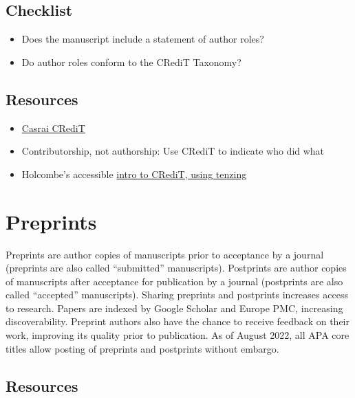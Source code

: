 \documentclass[
  oneside]{book}
\providecommand{\tightlist}{%
  \setlength{\itemsep}{0pt}\setlength{\parskip}{0pt}}
\begin{document}
\hypertarget{checklist-5}{%
\section{Checklist}\label{checklist-5}}

\begin{itemize}
\tightlist
\item
  Does the manuscript include a statement of author roles?
\item
  Do author roles conform to the CRediT Taxonomy?
\end{itemize}

\hypertarget{resources-4}{%
\section{Resources}\label{resources-4}}

\begin{itemize}
\tightlist
\item
  \href{https://casrai.org/credit/}{Casrai CRediT}
\item
  Contributorship, not authorship: Use CRediT to indicate who did what \citep{holcombe2019contributorship}
\item
  Holcombe's accessible \href{https://alexholcombe.medium.com/announcing-tenzing-ceca6789d88c}{intro to CRediT, using tenzing}
\end{itemize}

\hypertarget{editors-preprints}{%
\chapter{Preprints}\label{editors-preprints}}

Preprints are author copies of manuscripts prior to acceptance by a journal (preprints are also called ``submitted'' manuscripts). Postprints are author copies of manuscripts after acceptance for publication by a journal (postprints are also called ``accepted'' manuscripts). Sharing preprints and postprints increases access to research. Papers are indexed by Google Scholar and Europe PMC, increasing discoverability. Preprint authors also have the chance to receive feedback on their work, improving its quality prior to publication. As of August 2022, all APA core titles allow posting of preprints and postprints without embargo.

\hypertarget{resources-5}{%
\section{Resources}\label{resources-5}}
\end{document}
